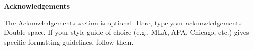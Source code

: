 \begin{center}
\textbf{\large Acknowledgements}    
\end{center}

\begin{doublespace}
    The Acknowledgements section is optional. Here, type your acknowledgements.
    Double-space. 
    If your style guide of choice (e.g., MLA, APA, Chicago, etc.) gives specific formatting guidelines, follow them.
\end{doublespace}